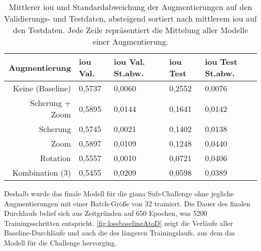 \begin{table}
	\centering
	\setlength{\extrarowheight}{0pt}
	\addtolength{\extrarowheight}{\aboverulesep}
	\addtolength{\extrarowheight}{\belowrulesep}
	\setlength{\aboverulesep}{0pt}
	\setlength{\belowrulesep}{0pt}
	\caption[Mittlerer \gls{iou} und Standardabweichung der Augmentierungen auf den Validierungs- und Testdaten]{Mittlerer \gls{iou} und Standardabweichung der Augmentierungen auf den Validierungs- und Testdaten, absteigend sortiert nach mittlerem \gls{iou} auf den Testdaten. Jede Zeile repräsentiert die Mittelung aller Modelle einer Augmentierung.}
	\begin{tabular}{rllll} 
		\toprule
		Augmentierung & \gls{iou} Val. & \gls{iou} Val. St.abw. & \gls{iou} Test & \gls{iou} Test St.abw. \\ 
		\toprule
		Keine (Baseline) & {\cellcolor[rgb]{0.612,0.816,0.529}}0,5737 & {\cellcolor[rgb]{0.537,0.792,0.514}}0,0060 & {\cellcolor[rgb]{0.388,0.745,0.482}}0,2552 & {\cellcolor[rgb]{0.388,0.745,0.482}}0,0076 \\
		Scherung + Zoom & {\cellcolor[rgb]{0.392,0.749,0.486}}0,5895 & {\cellcolor[rgb]{0.8,0.875,0.569}}0,0144 & {\cellcolor[rgb]{0.675,0.835,0.545}}0,1641 & {\cellcolor[rgb]{0.498,0.776,0.506}}0,0142 \\
		Scherung & {\cellcolor[rgb]{0.6,0.812,0.529}}0,5745 & {\cellcolor[rgb]{0.424,0.753,0.486}}0,0021 & {\cellcolor[rgb]{0.749,0.859,0.561}}0,1402 & {\cellcolor[rgb]{0.49,0.776,0.502}}0,0138 \\
		Zoom & {\cellcolor[rgb]{0.388,0.745,0.482}}0,5897 & {\cellcolor[rgb]{0.69,0.839,0.545}}0,0109 & {\cellcolor[rgb]{0.8,0.875,0.573}}0,1248 & {\cellcolor[rgb]{1,0.937,0.612}}0,0440 \\
		Rotation & {\cellcolor[rgb]{0.859,0.894,0.584}}0,5557 & {\cellcolor[rgb]{0.388,0.745,0.482}}0,0010 & {\cellcolor[rgb]{0.965,0.925,0.604}}0,0721 & {\cellcolor[rgb]{0.941,0.918,0.596}}0,0406 \\
		Kombination (3) & {\cellcolor[rgb]{1,0.937,0.612}}0,5455 & {\cellcolor[rgb]{1,0.937,0.612}}0,0209 & {\cellcolor[rgb]{1,0.937,0.612}}0,0598 & {\cellcolor[rgb]{0.914,0.91,0.592}}0,0389 \\
		\bottomrule
	\end{tabular}
\label{tab:aug}
\end{table}

Deshalb wurde das finale Modell für die \gls{giana} Sub-Challenge ohne jegliche Augmentierungen mit einer Batch-Größe von 32 trainiert.
Die Dauer des finalen Durchlaufs belief sich aus Zeitgründen auf 650 Epochen, was 5200 Trainingsschritten entspricht.
\autoref{fig:lossbaselineAtoD} zeigt die Verläufe aller Baseline-Durchläufe und auch die des längeren Trainingslaufs, aus dem das Modell für die Challenge hervorging.

